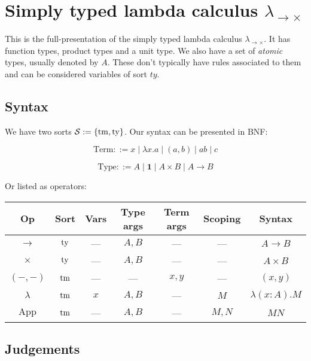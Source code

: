 \section{Simply typed lambda calculus \texorpdfstring{$\lambda_{\to \times}$}{}}\label{stlc_rule}

This is the full-presentation of the simply typed lambda calculus $\lambda_{\to \times}$. It has function types, product types and a unit type. We also have a set of \emph{atomic} types, usually denoted by $A$. These don't typically have rules associated to them and can be considered variables of sort $ty$.

\subsection{Syntax}\label{stlc_syntax}

We have two sorts $\mathcal{S} := \{ \mathrm{tm} , \mathrm{ty} \} $. Our syntax can be presented in BNF:

$$
    \mathrm{Term} ::= x \mid \lambda x . a \mid (a, b) \mid a b \mid c
$$

$$
    \mathrm{Type} ::= A \mid \mathbf{1} \mid A \times B \mid A \to B
$$

Or listed as operators:

\begin{center}
        \begin{tabular}{|c|c|c|c|c|c|c|}
        \hline Op & Sort & Vars & Type args & Term args & Scoping & Syntax \\
        \hline $\to$           & $\mathrm{ty}$ &  --- & $A,B$ &  ---  &  ---  & $A \to B$            \\
        \hline $\times$        & $\mathrm{ty}$ &  --- & $A,B$ &  ---  &  ---  & $A \times B$         \\
        \hline $(-,-)$         & $\mathrm{tm}$ &  --- &  ---  & $x,y$ &  ---  & $(x,y)$              \\
        \hline $\lambda$       & $\mathrm{tm}$ &  $x$ & $A,B$ &  ---  &  $M$  & $\lambda (x : A).M$  \\
        \hline $\mathrm{App}$  & $\mathrm{tm}$ &  --- & $A,B$ &  ---  & $M,N$ & $M N$ \\
        \hline
    \end{tabular}
\end{center}

\subsection{Judgements}\label{stlc_judgements}

